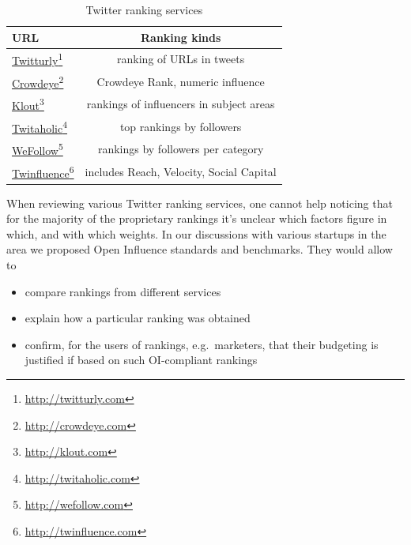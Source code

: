 \documentclass[10pt,oneside]{memoir}
\begin{document}
\begin{Spacing}{2}
\begin{table}[htbp]
\begin{minipage}{\linewidth}
\setlength{\tymax}{0.5\linewidth}
\centering
\small
\caption{Twitter ranking services}
\label{twitterrankingservices}
\begin{tabulary}{\linewidth}{@{}lc@{}} \\ \toprule 
URL&Ranking kinds \\\midrule
\href{http://twitturly.com}{Twitturly}\footnote{\href{http://twitturly.com}{http://twitturly.com}}&ranking of URLs in tweets \\
\href{http://crowdeye.com}{Crowdeye}\footnote{\href{http://crowdeye.com}{http://crowdeye.com}}&Crowdeye Rank, numeric influence \\
\href{http://klout.com}{Klout}\footnote{\href{http://klout.com}{http://klout.com}}&rankings of influencers in subject areas \\
\href{http://twitaholic.com}{Twitaholic}\footnote{\href{http://twitaholic.com}{http://twitaholic.com}}&top rankings by followers \\
\href{http://wefollow.com}{WeFollow}\footnote{\href{http://wefollow.com}{http://wefollow.com}}&rankings by followers per category \\
\href{http://twinfluence.com}{Twinfluence}\footnote{\href{http://twinfluence.com}{http://twinfluence.com}}&includes Reach, Velocity, Social Capital \\

		\bottomrule
	\end{tabulary}
\end{minipage}
\end{table}

When reviewing various Twitter ranking services, one cannot help noticing that for the majority of the proprietary rankings it's unclear which factors figure in which, and with which weights.  In our discussions with various startups in the area we proposed Open Influence standards and benchmarks.  They would allow to


\begin{itemize}


\item compare rankings from different services

\item explain how a particular ranking was obtained

\item confirm, for the users of rankings, e.g.\ marketers, that their budgeting is justified if based on such OI-compliant rankings


\end{itemize}
\end{Spacing}
\end{document}
